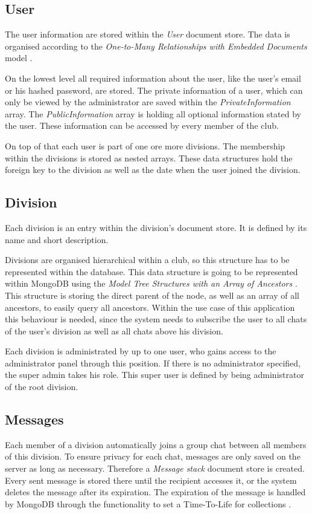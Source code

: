 \subsection{User}
The user information are stored within the \emph{User} document store. The data is organised according to the \emph{One-to-Many Relationships with Embedded Documents} model \cite[p. 141]{Mongo:2014aa}.

On the lowest level all required information about the user, like the user's email or his hashed password, are stored. The private information of a user, which can only be viewed by the administrator are saved within the \emph{PrivateInformation} array. The \emph{PublicInformation} array is holding all optional information stated by the user. These information can be accessed by every member of the club.

On top of that each user is part of one ore more divisions. The membership within the divisions is stored as nested arrays. These data structures hold the foreign key to the division as well as the date when the user joined the division.

\subsection{Division}
Each division is an entry within the division's document store. It is defined by its name and short description.

Divisions are organised hierarchical within a club, so this structure has to be represented within the database. This data structure is going to be represented within MongoDB using the \emph{Model Tree Structures with an Array of Ancestors} \cite[p. 149]{Mongo:2014aa}. This structure is storing the direct parent of the node, as well as an array of all ancestors, to easily query all ancestors. Within the use case of this application this behaviour is needed, since the system needs to subscribe the user to all chats of the user's division as well as all chats above his division.

Each division is administrated by up to one user, who gains access to the administrator panel through this position. If there is no administrator specified, the super admin takes his role. This super user is defined by being administrator of the root division.

\subsection{Messages}
Each member of a division automatically joins a group chat between all members of this division. To ensure privacy for each chat, messages are only saved on the server as long as necessary. Therefore a \emph{Message stack} document store is created. Every sent message is stored there until the recipient accesses it, or the system deletes the message after its expiration. The expiration of the message is handled by MongoDB through the functionality to set a Time-To-Life for collections \cite[p. 198]{Mongo:2014aa}.

